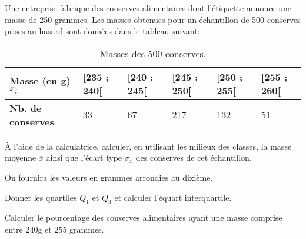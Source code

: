 
Une entreprise fabrique des conserves alimentaires dont l'étiquette annonce une masse de 250 grammes.
Les masses obtenues pour un échantillon de 500 conserves prises au hasard sont données dans le tableau suivant: 

\begin{table}[h]
\centering
\caption{Masses des 500 conserves.}
\label{table_conserves}
\begin{tabular}{|l|l|l|l|l|l|}
\hline
\textbf{Masse (en g) $x_{i}$}        & {[}235 ; 240{[} & {[}240 ; 245{[} & {[}245 ; 250{[} & {[}250 ; 255{[} & {[}255 ; 260{[} \\ \hline
\textbf{Nb. de conserves} & 33              & 67              & 217             & 132             & 51              \\ \hline
\end{tabular}
\end{table}

\question{}
À l'aide de la calculatrice, calculer, en utilisant les milieux des classes, la masse moyenne $\overline{x}$ ainsi que l'écart type $\sigma_x$ des conserves de cet échantillon.

On fournira les valeurs en grammes arrondies au dixième.


\question{}
Donner les quartiles $Q_1$ et $Q_3$ et calculer l'équart interquartile.


\question{}
Calculer le pourcentage des conserves alimentaires ayant une masse comprise entre 240g et 255 grammes. 

